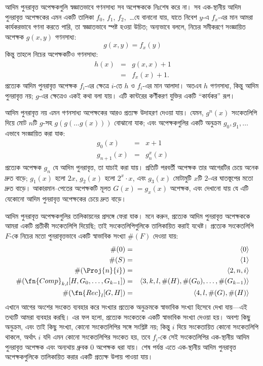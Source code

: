 \documentclass[../../../include/open-logic-section]{subfiles}
\begin{document}

আদিম পুনরাবৃত্ত অপেক্ষকগুলি স্বজ্ঞাতভাবে গণনসাধ্য সব অপেক্ষককে নিঃশেষ
করে না। সব এক-স্থানীয় আদিম পুনরাবৃত্ত অপেক্ষকের এমন একটি তালিকা
$f_0$, $f_1$, $f_2$,~\dots যে বানানো যায়, যাতে নিবেশ $y$-এ $f_x$-এর
মান আমরা কার্যকরভাবে গণনা করতে পারি, তা স্বজ্ঞাতভাবে স্পষ্ট হওয়া উচিত;
অন্যভাবে বললে, নিচের সমীকরণে সংজ্ঞায়িত অপেক্ষক $g(x,y)$ গণনসাধ্য:
\[
g(x,y) = f_x(y)
\]
কিন্তু তাহলে নিচের অপেক্ষকটিও গণনসাধ্য:
\begin{eqnarray*}
h(x) & = & g(x,x) + 1 \\
& = & f_x(x) +1.
\end{eqnarray*}
প্রত্যেক আদিম পুনরাবৃত্ত অপেক্ষক $f_i$-এর ক্ষেত্রে $i$-তে $h$ ও
$f_i$-এর মান আলাদা। অতএব $h$ গণনসাধ্য, কিন্তু আদিম পুনরাবৃত্ত নয়;
$g$-এর ক্ষেত্রেও একই কথা বলা যায়। এটি কান্টরের কর্ণীকরণ যুক্তির একটি
“কার্যকর” রূপ।

আদিম পুনরাবৃত্ত নয় এমন গণনসাধ্য অপেক্ষকের আরও প্রত্যক্ষ উদাহরণ দেওয়া
যায়। যেমন, $g^n(x)$ সংকেতলিপি দিয়ে মোট $n$টি $g$-সহ
$g(g(\dots g(x)))$ বোঝানো যাক; এবং অপেক্ষকগুলির একটি অনুক্রম
$g_0,g_1,\dots$ এভাবে সংজ্ঞায়িত করা যাক:
\begin{eqnarray*}
g_0(x) & = & x+1 \\
g_{n + 1}(x) & = & g_n^x(x)
\end{eqnarray*}
প্রত্যেক অপেক্ষক $g_n$ যে আদিম পুনরাবৃত্ত, তা যাচাই করা যায়। প্রতিটি
পরবর্তী অপেক্ষক তার আগেরটির চেয়ে অনেক দ্রুত বাড়ে; $g_1(x)$ হলো $2x$,
$g_2(x)$ হলো $2^x \cdot x$, এবং $g_3(x)$ মোটামুটি $x$টি $2$-এর ঘাতস্তূপের
মতো দ্রুত বাড়ে। আকারমান--পেতের অপেক্ষকটি মূলত $G(x) = g_x(x)$ অপেক্ষক,
এবং দেখানো যায় যে এটি যেকোনো আদিম পুনরাবৃত্ত অপেক্ষকের চেয়ে দ্রুত বাড়ে।

আদিম পুনরাবৃত্ত অপেক্ষকগুলির তালিকায়নের প্রসঙ্গে ফেরা যাক। মনে করুন,
প্রত্যেক আদিম পুনরাবৃত্ত অপেক্ষককে আমরা একটি প্রতীকী সংকেতলিপি দিয়েছি;
তাই সংকেতলিপিগুলিকে তালিকায়িত করাই যথেষ্ট। প্রত্যেক সংকেতলিপি $F$-কে
নিচের মতো পুনরাবৃত্তভাবে একটি স্বাভাবিক সংখ্যা $\#(F)$ দেওয়া যায়:
\begin{eqnarray*}
\#(0) & = & \langle 0 \rangle \\
\#(S) & = & \langle 1 \rangle \\
\#(\Proj{n}{i}) & = & \langle 2, n, i \rangle \\
\#(\fn{Comp}_{k,l}[H,G_0,\dots,G_{k-1}]) & = & \langle
3,k,l,\#(H),\#(G_0),\dots,\#(G_{k-1}) \rangle \\
\#(\fn{Rec}_l[G,H]) & = & \langle 4, l, \#(G), \#(H) \rangle
\end{eqnarray*}
এখানে আগের অংশের সংকেত ব্যবহার করে সংখ্যার প্রত্যেক অনুক্রমকে স্বাভাবিক
সংখ্যা হিসেবে দেখা যায়—এই তথ্যটি আমরা ব্যবহার করছি। এর ফল হলো, প্রত্যেক
সংকেতকে একটি স্বাভাবিক সংখ্যা দেওয়া হয়। অবশ্য কিছু অনুক্রম, এবং তাই কিছু
সংখ্যা, কোনো সংকেতলিপির সঙ্গে সংশ্লিষ্ট নয়; কিন্তু $i$ দিয়ে সংকেতায়িত
কোনো সংকেতলিপি থাকলে, অর্থাৎ $i$ যদি এমন কোনো সংকেতলিপির সংকেত হয়, তবে
$f_i$-কে সেই সংকেতলিপির এক-স্থানীয় আদিম
পুনরাবৃত্ত অপেক্ষক এবং অন্যথায় ধ্রুবক $0$ অপেক্ষক ধরা যায়। শেষ পর্যন্ত
এতে এক-স্থানীয় আদিম পুনরাবৃত্ত অপেক্ষকগুলিকে তালিকায়িত করার একটি
প্রত্যক্ষ উপায় পাওয়া যায়।
\end{document}
